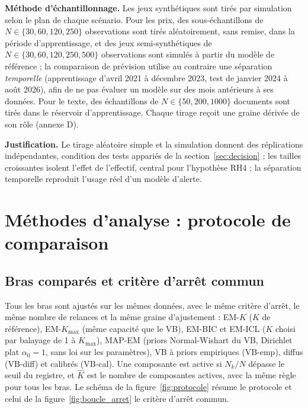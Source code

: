 \textbf{Méthode d'échantillonnage. }Les jeux synthétiques sont tirés par simulation selon le plan de chaque scénario. Pour les prix, des sous-échantillons de $N \in \{30, 60, 120, 250\}$ observations sont tirés aléatoirement, sans remise, dans la période d'apprentissage, et des jeux semi-synthétiques de $N \in \{30, 60, 120, 250, 500\}$ observations sont simulés à partir du modèle de référence ; la comparaison de prévision utilise au contraire une séparation \emph{temporelle} (apprentissage d'avril 2021 à décembre 2023, test de janvier 2024 à août 2026), afin de ne pas évaluer un modèle sur des mois antérieurs à ses données. Pour le texte, des échantillons de $N \in \{50, 200, 1000\}$ documents sont tirés dans le réservoir d'apprentissage. Chaque tirage reçoit une graine dérivée de son rôle (annexe D).

\textbf{Justification. }Le tirage aléatoire simple et la simulation donnent des réplications indépendantes, condition des tests appariés de la section~\ref{sec:decision} ; les tailles croissantes isolent l'effet de l'effectif, central pour l'hypothèse RH4 ; la séparation temporelle reproduit l'usage réel d'un modèle d'alerte.

\section{Méthodes d'analyse : protocole de comparaison}\label{sec:protocole}
\subsection{Bras comparés et critère d'arrêt commun}\label{sec:bras_compares_et_critere_d}
Tous les bras sont ajustés sur les mêmes données, avec le même critère d'arrêt, le même nombre de relances et la même graine d'ajustement : EM-$K$ ($K$ de référence), EM-$K_{\max}$ (même capacité que le VB), EM-BIC et EM-ICL ($K$ choisi par balayage de 1 à $K_{\max}$), MAP-EM (priors Normal-Wishart du VB, Dirichlet plat $\alpha_0 = 1$, sans loi sur les paramètres), VB à priors empiriques (VB-emp), diffus (VB-diff) et calibrés (VB-cal). Une composante est active si $N_k/N$ dépasse le seuil du registre, et $\hat K$ est le nombre de composantes actives, avec la même règle pour tous les bras. Le schéma de la figure~\ref{fig:protocole} résume le protocole et celui de la figure~\ref{fig:boucle_arret} le critère d'arrêt commun.




